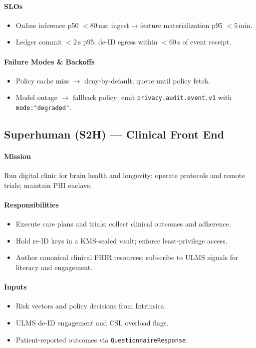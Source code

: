 \documentclass[11pt]{article}
\theoremstyle{plain}
\begin{document}
\paragraph{SLOs}
\begin{itemize}
  \item Online inference p50 $<80$\,ms; ingest$\rightarrow$feature materialization p95 $<5$\,min.
  \item Ledger commit $<2$\,s p95; de-ID egress within $<60$\,s of event receipt.
\end{itemize}

\paragraph{Failure Modes \& Backoffs}
\begin{itemize}
  \item Policy cache miss $\rightarrow$ deny-by-default; queue until policy fetch.
  \item Model outage $\rightarrow$ fallback policy; emit \texttt{privacy.audit.event.v1} with \texttt{mode:"degraded"}.
\end{itemize}

\bigskip
\subsection{Superhuman (S2H) — Clinical Front End}

\paragraph{Mission}
Run digital clinic for brain health and longevity; operate protocols and remote trials; maintain PHI enclave.

\paragraph{Responsibilities}
\begin{itemize}
  \item Execute care plans and trials; collect clinical outcomes and adherence.
  \item Hold re-ID keys in a KMS-sealed vault; enforce least-privilege access.
  \item Author canonical clinical FHIR resources; subscribe to ULMS signals for literacy and engagement.
\end{itemize}

\paragraph{Inputs}
\begin{itemize}
  \item Risk vectors and policy decisions from Intrinsica.
  \item ULMS de-ID engagement and CSL overload flags.
  \item Patient-reported outcomes via \texttt{QuestionnaireResponse}.
\end{itemize}
\end{document}
